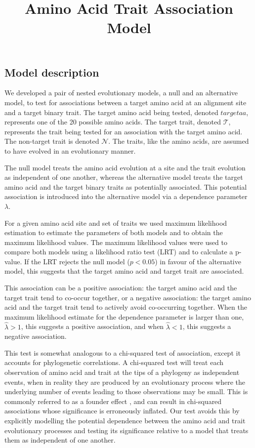 \documentclass[]{article}
\title{Amino Acid Trait Association Model}
\date{}
\begin{document}
\maketitle

\subsection*{Model description}
We developed a pair of nested evolutionary models, a null and an alternative model, to test for associations between a target amino acid at an alignment site and a target binary trait. The target amino acid being tested, denoted $targetaa$, represents one of the 20 possible amino acids. The target trait, denoted $\mathcal{T}$, represents the trait being tested for an association with the target amino acid. The non-target trait is denoted $\mathcal{N}$. The traits, like the amino acids, are assumed to have evolved in an evolutionary manner.

The null model treats the amino acid evolution at a site and the trait evolution as independent of one another, whereas the alternative model treats the target amino acid and the target binary traits as potentially associated. This potential association is introduced into the alternative model via a dependence parameter $\lambda$. 

For a given amino acid site and set of traits we used maximum likelihood estimation to estimate the parameters of both models and to obtain the maximum likelihood values. The maximum likelihood values were used to compare both models using a likelihood ratio test (LRT) and to calculate a p-value. If the LRT rejects the null model ($p<0.05$) in favour of the alternative model, this suggests that the target amino acid and target trait are associated. 

This association can be a positive association: the target amino acid and the target trait tend to co-occur together, or a negative association: the target amino acid and the target trait tend to actively avoid co-occurring together. When the maximum likelihood estimate for the dependence parameter is larger than one, $\hat{\lambda}>1$, this suggests a positive association, and when $\hat{\lambda}<1$, this suggests a negative association.

This test is somewhat analogous to a chi-squared test of association, except it accounts for phylogenetic correlations. A chi-squared test will treat each observation of amino acid and trait at the tips of a phylogeny as independent events, when in reality they are produced by an evolutionary process where the underlying number of events leading to those observations may be small. This is commonly referred to as a founder effect \citep{bhattacharya2007founder}, and can result in chi-squared associations whose significance is erroneously inflated. Our test avoids this by explicitly modelling the potential dependence between the amino acid and trait evolutionary processes and testing its significance relative to a model that treats them as independent of one another.
\end{document}
